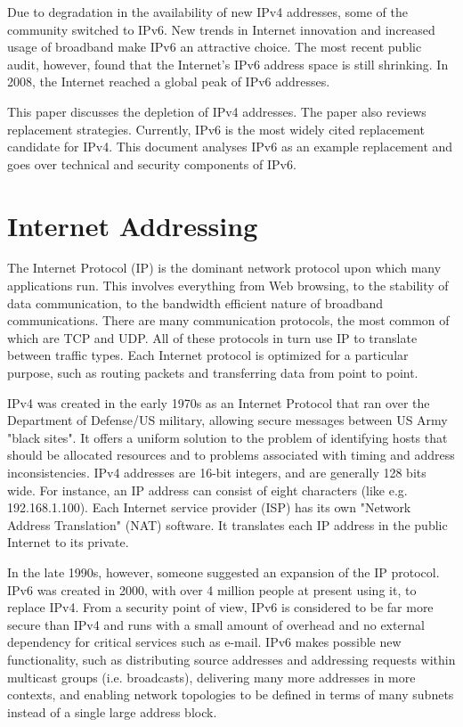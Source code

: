 \documentclass[conference,12pt]{IEEEtran}
\begin{document}
Due to degradation in the availability of new IPv4 addresses, some of the community switched to IPv6. New trends in Internet innovation and increased usage of broadband make IPv6 an attractive choice. The most recent public audit, however, found that the Internet's IPv6 address space is still shrinking. In 2008, the Internet reached a global peak of IPv6 addresses.

This paper discusses the depletion of IPv4 addresses. The paper also reviews replacement strategies. Currently, IPv6 is the most widely cited replacement candidate for IPv4. This document analyses IPv6 as an example replacement and goes over technical and security components of IPv6.

\section{Internet Addressing}
The Internet Protocol (IP) is the dominant network protocol upon which many applications run.  This involves everything from Web browsing, to the stability of data communication, to the bandwidth efficient nature of broadband communications. There are many communication protocols, the most common of which are TCP and UDP. All of these protocols in turn use IP to translate between traffic types. Each Internet protocol is optimized for a particular purpose, such as routing packets and transferring data from point to point.

IPv4  was created in the early 1970s as an Internet Protocol that ran over the Department of Defense/US military, allowing secure messages between US Army "black sites". It offers a uniform solution to the problem of identifying hosts that should be allocated resources and to problems associated with timing and address inconsistencies. IPv4 addresses are 16-bit integers, and are generally 128 bits wide. For instance, an IP address can consist of eight characters (like e.g. 192.168.1.100). Each Internet service provider (ISP) has its own "Network Address Translation" (NAT) software.  It translates each IP address in the public Internet to its private.

In the late 1990s, however, someone suggested an expansion of the IP protocol. IPv6  was created in 2000, with over 4 million people at present using it, to replace IPv4. From a security point of view, IPv6 is considered to be far more secure than IPv4 and runs with a small amount of overhead and no external dependency for critical services such as e-mail. IPv6 makes possible new functionality, such as distributing source addresses and addressing requests within multicast groups (i.e. broadcasts), delivering many more addresses in more contexts, and enabling network topologies to be defined in terms of many subnets instead of a single large address block.
\end{document}
